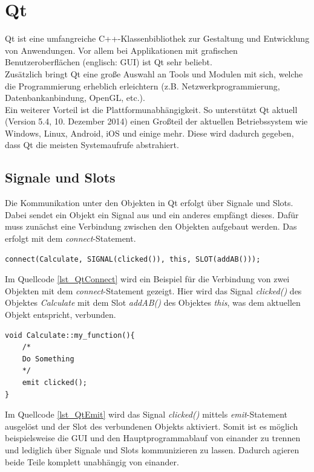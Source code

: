 \section{Qt}
\label{section_Qt}
Qt ist eine umfangreiche C++-Klassenbibliothek zur Gestaltung und Entwicklung von Anwendungen. Vor allem bei Applikationen mit grafischen Benutzeroberflächen (englisch: \ac{GUI}) ist Qt sehr beliebt. \\
Zusätzlich bringt Qt eine große Auswahl an Tools und Modulen mit sich, welche die Programmierung erheblich erleichtern (z.B. Netzwerkprogrammierung, Datenbankanbindung, OpenGL, etc.). \\
Ein weiterer Vorteil ist die Plattformunabhängigkeit. So unterstützt Qt aktuell (Version 5.4, 10. Dezember 2014) einen Großteil der aktuellen Betriebssystem wie Windows, Linux, Android, iOS und einige mehr. Diese wird dadurch gegeben, dass Qt die meisten Systemaufrufe abstrahiert.

\subsection{Signale und Slots}
\label{QtSignaleSlots}
Die Kommunikation unter den Objekten in Qt erfolgt über Signale und Slots. Dabei sendet ein Objekt ein Signal aus und ein anderes empfängt dieses. Dafür muss zunächst eine Verbindung zwischen den Objekten aufgebaut werden. Das erfolgt mit dem \textit{connect}-Statement.\\

\begin{lstlisting}[caption={Qt \textit{connect}-Statement},label=lst_QtConnect]
connect(Calculate, SIGNAL(clicked()), this, SLOT(addAB()));
\end{lstlisting}

Im Quellcode \ref{lst_QtConnect} wird ein Beispiel für die Verbindung von zwei Objekten mit dem \textit{connect}-Statement gezeigt. Hier wird das Signal \textit{clicked()} des Objektes \textit{Calculate} mit dem Slot \textit{addAB()} des Objektes \textit{this}, was dem aktuellen Objekt entspricht, verbunden. \\

\begin{lstlisting}[caption={Qt \textit{emit}-Statement},label=lst_QtEmit]
void Calculate::my_function(){
	/*
	Do Something
	*/
	emit clicked();	
}
\end{lstlisting}

Im Quellcode \ref{lst_QtEmit} wird das Signal \textit{clicked()} mittels \textit{emit}-Statement ausgelöst und der Slot des verbundenen Objekts aktiviert. Somit ist es möglich beispielsweise die GUI und den Hauptprogrammablauf von einander zu trennen und lediglich über Signale und Slots kommunizieren zu lassen. Dadurch agieren beide Teile komplett unabhängig von einander.

